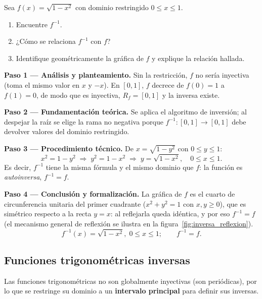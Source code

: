 \begin{example} Sea $f(x) = \sqrt{1-x^2}$ con dominio restringido
$0 \leq x \leq 1$.
\begin{enumerate}
  \item Encuentre $f^{-1}$.
  \item ¿Cómo se relaciona $f^{-1}$ con $f$?
  \item Identifique geométricamente la gráfica de $f$ y explique la
        relación hallada.
\end{enumerate}

\begin{myproof}
\textbf{Paso 1 — Análisis y planteamiento.}
Sin la restricción, $f$ no sería inyectiva (toma el mismo valor en $x$ y
$-x$). En $[0,1]$, $f$ decrece de $f(0)=1$ a $f(1)=0$, de modo que es
inyectiva, $R_f = [0,1]$ y la inversa existe.

\textbf{Paso 2 — Fundamentación teórica.}
Se aplica el algoritmo de inversión; al despejar la raíz se elige la rama
no negativa porque $f^{-1}: [0,1] \to [0,1]$ debe devolver valores del
dominio restringido.

\textbf{Paso 3 — Procedimiento técnico.}
De $x = \sqrt{1-y^2}$ con $0\le y\le 1$:
\[
  x^2 = 1 - y^2 \;\Rightarrow\; y^2 = 1 - x^2 \;\Rightarrow\;
  y = \sqrt{1-x^2}, \quad 0 \leq x \leq 1.
\]
Es decir, $f^{-1}$ tiene la misma fórmula y el mismo dominio que $f$: la
función es \emph{autoinversa}, $f^{-1} = f$.

\textbf{Paso 4 — Conclusión y formalización.}
La gráfica de $f$ es el cuarto de circunferencia unitaria del primer
cuadrante ($x^2+y^2=1$ con $x,y \geq 0$), que es simétrico respecto a la
recta $y=x$: al reflejarla queda idéntica, y por eso $f^{-1}=f$ (el
mecanismo general de reflexión se ilustra en la
figura~\ref{fig:inversa_reflexion}).
\[
  \boxed{f^{-1}(x) = \sqrt{1-x^2},\; 0\le x\le 1; \qquad f^{-1} = f.}
\]
\end{myproof}
\end{example}

\subsection{Funciones trigonométricas inversas}

Las funciones trigonométricas no son globalmente inyectivas (son periódicas), por lo que se restringe su dominio a un \textbf{intervalo principal} para definir sus inversas.

